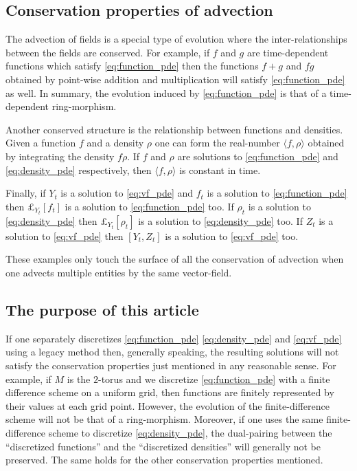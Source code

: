 \documentclass[12pt]{amsart}
\begin{document}
\subsection{Conservation properties of advection}
The advection of fields is a special type of evolution where the inter-relationships between the fields are conserved.
For example, if $f$ and $g$ are time-dependent functions which satisfy \eqref{eq:function_pde} then the functions $f+g$ and $fg$
obtained by point-wise addition and multiplication will satisfy \eqref{eq:function_pde} as well.
In summary, the evolution induced by \eqref{eq:function_pde} is that of a time-dependent ring-morphism.

Another conserved structure is the relationship between functions and densities.  Given a function $f$ and a density $\rho$
one can form the real-number $\langle f, \rho \rangle$ obtained by integrating the density $f \rho$.
If $f$ and $\rho$ are solutions to \eqref{eq:function_pde} and \eqref{eq:density_pde} respectively, then $\langle f , \rho \rangle$ is constant in time.

Finally, if $Y_t$ is a solution to \eqref{eq:vf_pde} and $f_t$ is a solution to \eqref{eq:function_pde} then $\pounds_{Y_t}[f_t]$ is a solution to \eqref{eq:function_pde} too.
If $\rho_t$ is a solution to \eqref{eq:density_pde} then $\pounds_{Y_t}[ \rho_t]$ is a solution to \eqref{eq:density_pde} too.
If $Z_t$ is a solution to \eqref{eq:vf_pde} then $[Y_t,Z_t]$ is a solution to \eqref{eq:vf_pde} too.

These examples only touch the surface of all the conservation of advection when one advects multiple entities by the same vector-field.

\subsection{The purpose of this article}
\label{sec:purpose}
If one separately discretizes \eqref{eq:function_pde} \eqref{eq:density_pde} and \eqref{eq:vf_pde} using a legacy method
then, generally speaking, the resulting solutions will not satisfy the conservation properties just mentioned in any reasonable sense.
For example, if $M$ is the $2$-torus and we discretize \eqref{eq:function_pde} with a finite difference scheme on a uniform grid,
then functions are finitely represented by their values at each grid point.
However, the evolution of the finite-difference scheme will not be that of a ring-morphism.
Moreover, if one uses the same finite-difference scheme to discretize \eqref{eq:density_pde}, the dual-pairing between the 
``discretized functions'' and the ``discretized densities'' will generally not be preserved.
The same holds for the other conservation properties mentioned.
\end{document}
